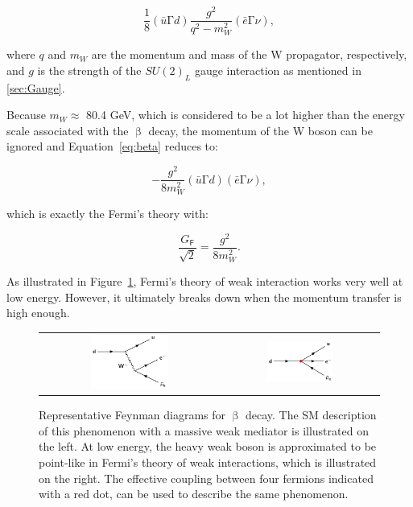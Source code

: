 \begin{equation}
\label{eq:beta}
\frac{1}{8}(\bar{u}\mathrm{\Gamma}d)\frac{g^2}{q^2-m_{W}^2}(\bar{e}\mathrm{\Gamma}\nu),
\end{equation}

where $q$ and $m_W$ are the momentum and mass of the W propagator, respectively, and $g$ is the strength of the $SU(2)_{L}$ gauge interaction as mentioned in \autoref{sec:Gauge}.

Because $m_W\approx$ 80.4 GeV, which is considered to be a lot higher than the energy scale associated with the $\upbeta$ decay, the momentum of the W boson can be ignored and Equation~\ref{eq:beta} reduces to:

\begin{equation}
\label{eq:beta2}
-\frac{g^2}{8m_{W}^2}(\bar{u}\mathrm{\Gamma}d)(\bar{e}\mathrm{\Gamma}\nu),
\end{equation}

which is exactly the Fermi's theory with:

\begin{equation}
\frac{G_{\textsf{F}}}{\sqrt{2}}=\frac{g^2}{8m_{W}^2}.
\end{equation}

As illustrated in Figure~\ref{fig:FermiEFT}, Fermi's theory of weak interaction works very well at low energy. However, it ultimately breaks down when the momentum transfer is high enough. 

\begin{figure}[tbh!]
 \begin{center}
 \begin{tabular}{cc}
 \includegraphics[width=0.45\textwidth]{figures/Part1/EFT/BetaDecay}&
 \includegraphics[width=0.45\textwidth]{figures/Part1/EFT/FermiTheory}\\
 \end{tabular}
 \caption{Representative Feynman diagrams for $\upbeta$ decay. The \ac{SM} description of this phenomenon with a massive weak mediator is illustrated on the left. At low energy, the heavy weak boson is approximated to be point-like in Fermi's theory of weak interactions, which is illustrated on the right. The effective coupling between four fermions indicated with a red dot, can be used to describe the same phenomenon.}
 \label{fig:FermiEFT}
 \end{center}
\end{figure}

